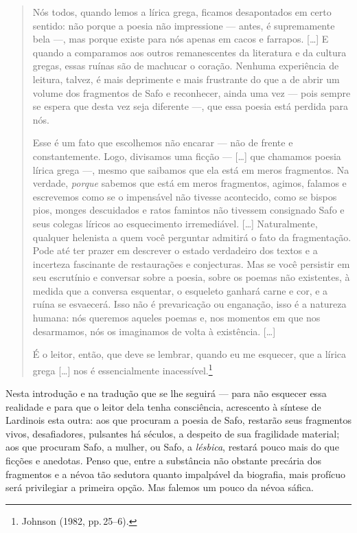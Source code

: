 \begin{quote}
Nós todos, quando lemos a lírica grega, ficamos desapontados em certo sentido:
não porque a poesia não impressione --- antes, é supremamente bela ---, mas
porque existe para nós apenas em cacos e farrapos. {[}\ldots{}{]} E quando a comparamos
aos outros remanescentes da literatura e da cultura gregas, essas ruínas são de
machucar o coração. Nenhuma experiência de leitura, talvez, é mais deprimente e
mais frustrante do que a de abrir um volume dos fragmentos de Safo e
reconhecer, ainda uma vez --- pois sempre se espera que desta vez seja diferente
---, que essa poesia está perdida para nós.

Esse é um fato que escolhemos não encarar --- não de frente e constantemente.
Logo, divisamos uma ficção --- {[}\ldots{}{]} que chamamos poesia lírica grega ---,
mesmo que saibamos que ela está em meros fragmentos. Na verdade,
\emph{porque} sabemos que está em meros fragmentos, agimos, falamos
e escrevemos como se o impensável não tivesse acontecido, como se bispos pios,
monges descuidados e ratos famintos não tivessem consignado Safo e seus colegas
líricos ao esquecimento irremediável. {[}\ldots{}{]} Naturalmente, qualquer helenista a
quem você perguntar admitirá o fato da fragmentação. Pode até ter prazer em
descrever o estado verdadeiro dos textos e a incerteza fascinante de
restaurações e conjecturas. Mas se você persistir em seu escrutínio e conversar
sobre a poesia, sobre os poemas não existentes, à medida que a conversa
esquentar, o esqueleto ganhará carne e cor, e a ruína se esvaecerá. Isso não é
prevaricação ou enganação, isso é a natureza humana: nós queremos aqueles
poemas e, nos momentos em que nos desarmamos, nós os imaginamos de volta à
existência. {[}\ldots{}{]}

É o leitor, então, que deve se lembrar, quando eu me esquecer, que a lírica
grega {[}\ldots{}{]} nos é essencialmente inacessível.\footnote{ Johnson (1982, pp.\,25--6).}
\end{quote}

Nesta introdução e na tradução que se lhe seguirá ---
para não esquecer essa realidade e para que o leitor dela tenha consciência,
acrescento à síntese de Lardinois esta outra: aos que procuram a poesia de
Safo, restarão seus fragmentos vivos, desafiadores, pulsantes há séculos, a
despeito de sua fragilidade material; aos que procuram Safo, a mulher, ou Safo,
a \emph{lésbica}, restará pouco mais do que ficções e anedotas. Penso que,
entre a substância não obstante precária dos fragmentos e a névoa tão sedutora
quanto impalpável da biografia, mais profícuo será privilegiar a primeira
opção. Mas falemos um pouco da névoa sáfica.


